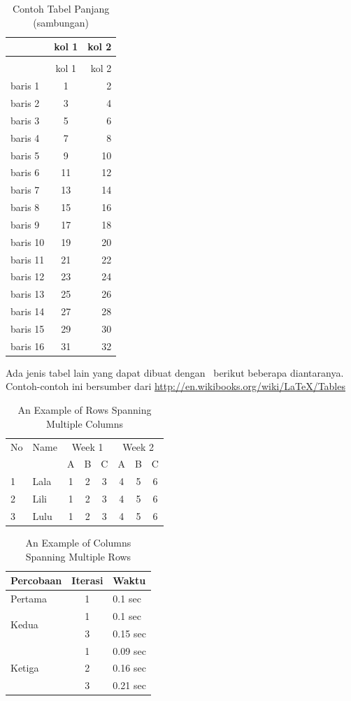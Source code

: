 \begin{longtable}{| l | c r |}
\caption{Contoh Tabel Panjang}
\label{tab:tab2} \\
\hline
& kol 1 & kol 2 \\
\hline
\caption[]{Contoh Tabel Panjang (sambungan)} \\
\hline
& kol 1 & kol 2 \\
\hline
\hline
\hline
baris 1  & 1 & 2 \\
baris 2  & 3 & 4 \\
baris 3  & 5 & 6 \\
baris 4  & 7 & 8 \\
baris 5  & 9 & 10 \\
baris 6  & 11 & 12 \\
baris 7  & 13 & 14 \\
baris 8  & 15 & 16 \\
baris 9  & 17 & 18 \\
baris 10 & 19 & 20 \\
baris 11 & 21 & 22 \\
baris 12 & 23 & 24 \\
baris 13 & 25 & 26 \\
baris 14 & 27 & 28 \\
baris 15 & 29 & 30 \\
baris 16 & 31 & 32 \\
\end{longtable}

Ada jenis tabel lain yang dapat dibuat dengan \latex~berikut beberapa diantaranya.
Contoh-contoh ini bersumber dari \url{http://en.wikibooks.org/wiki/LaTeX/Tables}

\begin{table}
	\centering
	\caption{An Example of Rows Spanning Multiple Columns}
	\label{row.spanning}
	\begin{tabular}{|l|l|*{6}{c|}}
		No & Name & \multicolumn{3}{|c|}{Week 1} & \multicolumn{3}{|c|}{Week 2} \\
		& & A & B & C & A & B & C\\
		\hline
		1 & Lala & 1 & 2 & 3 & 4 & 5 & 6\\
		2 & Lili & 1 & 2 & 3 & 4 & 5 & 6\\
		3 & Lulu & 1 & 2 & 3 & 4 & 5 & 6\\
		\hline
	\end{tabular}
\end{table}

\begin{table}
	\centering
	\caption{An Example of Columns Spanning Multiple Rows}
	\label{column.spanning}
	\begin{tabular}{|l|c|l|}
		\hline
		Percobaan & Iterasi & Waktu \\
		\hline
		Pertama & 1 & 0.1 sec \\ \hline
		\multirow{2}{*}{Kedua} & 1 & 0.1 sec \\
		& 3 & 0.15 sec \\
		\hline
		\multirow{3}{*}{Ketiga} & 1 & 0.09 sec \\
		& 2 & 0.16 sec \\
		& 3 & 0.21 sec \\
		\hline
	\end{tabular}
\end{table}

